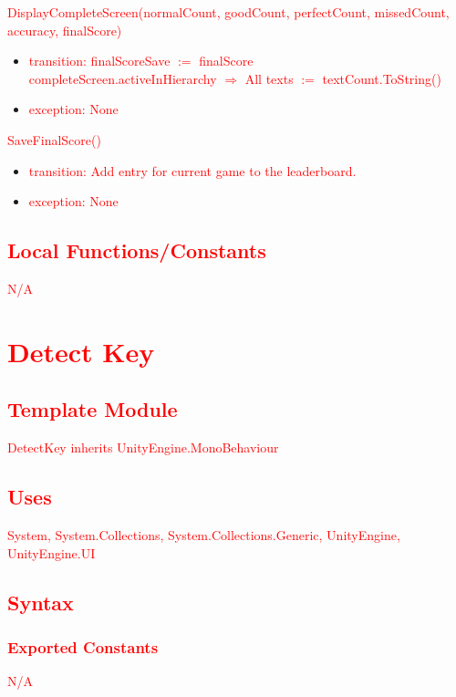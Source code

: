 \documentclass[12pt]{article}
\begin{document}
\noindent \textcolor{red}{DisplayCompleteScreen(normalCount, goodCount, perfectCount, missedCount, accuracy, finalScore)}
\begin{itemize}
    \item \textcolor{red}{transition: finalScoreSave $:=$ finalScore\\
          completeScreen.activeInHierarchy $\Rightarrow$ All texts $:=$ textCount.ToString()}
    \item \textcolor{red}{exception: None}
\end{itemize}

\noindent \textcolor{red}{SaveFinalScore()}
\begin{itemize}
    \item \textcolor{red}{transition: Add entry for current game to the leaderboard.}
    \item \textcolor{red}{exception: None}
\end{itemize}

\subsection{\textcolor{red}{Local Functions/Constants}}
\textcolor{red}{N/A}

\medskip

\newpage
\section{\textcolor{red}{Detect Key}}

\subsection{\textcolor{red}{Template Module}}
\textcolor{red}{DetectKey inherits UnityEngine.MonoBehaviour}

\subsection {\textcolor{red}{Uses}}
\textcolor{red}{System, System.Collections, System.Collections.Generic, UnityEngine, UnityEngine.UI}

\subsection {\textcolor{red}{Syntax}}

\subsubsection {\textcolor{red}{Exported Constants}}
\textcolor{red}{N/A}
\end{document}
